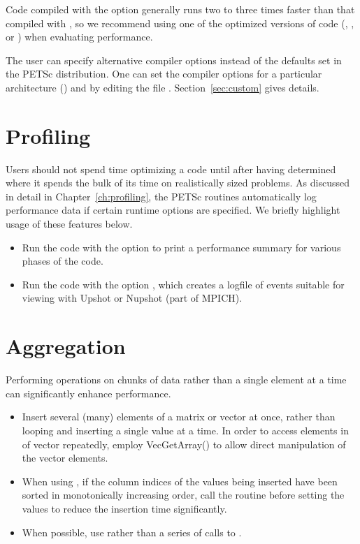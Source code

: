 Code compiled with the  option generally runs two to three times
faster than that compiled with , so we recommend using one
of the optimized versions of code (, , or
) when evaluating performance.

The user can specify alternative compiler options instead of
the defaults set in the PETSc distribution.  One can set
the compiler options for a particular architecture
() and  by editing the file
.
Section~\ref{sec:custom} gives details.

\section{Profiling}
  

Users should not spend time optimizing a code until after having determined
where it spends the bulk of its time on realistically sized problems.
As discussed in detail in Chapter~\ref{ch:profiling}, the PETSc
routines automatically log performance data if certain runtime options
are specified.  We briefly highlight usage of these features below.

\begin{itemize}
\item Run the code with the option  to print a performance
   summary for various phases of the code. 

\item Run the code with the option  \trl{[logfilename]}, which creates a
   logfile of events suitable for viewing with Upshot or Nupshot (part of
   MPICH). 

\end{itemize}

\section{Aggregation}

Performing operations on chunks of data rather than a single element
at a time can significantly enhance performance.  
\begin{itemize}
\item Insert several (many) elements of a matrix or vector at once, rather 
   than looping and inserting a single value at a time.  In order to
   access elements in of vector repeatedly, employ {VecGetArray()} to allow 
   direct manipulation of the vector elements. 

\item When using , if the column indices of the values being
   inserted have been sorted in monotonically increasing order, call
   the routine  before setting the values
   to reduce the insertion time significantly.

\item When possible, use  rather than a series of calls to .
\end{itemize}

